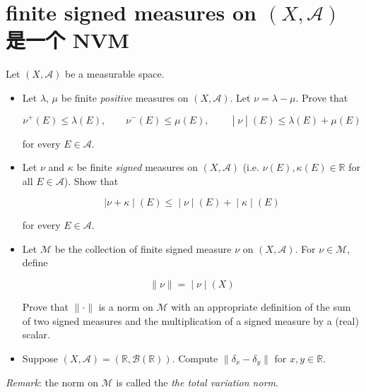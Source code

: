 \section{\texorpdfstring{finite signed measures on \((X,\mathcal{A})\) 是一个 NVM}{finite signed measures on (X,\textbackslash mathcal\{A\}) 是一个 NVM}}\label{finite-signed-measures-on-xmathcala-ux662fux4e00ux4e2a-nvm}

Let \((X,\mathcal{A})\) be a measurable space.

\begin{itemize}
\item
  Let \(\lambda\), \(\mu\) be finite \emph{positive} measures on \((X,\mathcal{A})\). Let \(\nu = \lambda - \mu\). Prove that

  \[\left. \nu^{+}(E) \leq \lambda(E),\qquad\nu^{-}(E) \leq \mu(E),\qquad \middle| \nu \middle| (E) \leq \lambda(E) + \mu(E) \right.\]

  for every \(E \in \mathcal{A}\).
\item
  Let \(\nu\) and \(\kappa\) be finite \emph{signed} measures on \((X,\mathcal{A})\) (i.e. \(\nu(E),\kappa(E) \in \mathbb{R}\) for all \(E \in \mathcal{A}\)). Show that

  \[\left. |\nu + \kappa \middle| (E) \leq \middle| \nu \middle| (E) + \middle| \kappa \middle| (E) \right.\]

  for every \(E \in \mathcal{A}\).
\item
  Let \(\mathcal{M}\) be the collection of finite signed measure \(\nu\) on \((X,\mathcal{A})\). For \(\nu \in \mathcal{M}\), define

  \[\left. \parallel \nu \parallel = \middle| \nu \middle| (X) \right.\]

  Prove that \(\parallel \cdot \parallel\) is a norm on \(\mathcal{M}\) with an appropriate definition of the sum of two signed measures and the multiplication of a signed measure by a (real) scalar.
\item
  Suppose \((X,\mathcal{A}) = (\mathbb{R},\mathcal{B}(\mathbb{R}))\). Compute \(\parallel \delta_{x} - \delta_{y} \parallel\) for \(x,y \in \mathbb{R}\).
\end{itemize}

\emph{Remark}: the norm on \(\mathcal{M}\) is called the \emph{the total variation norm}.

